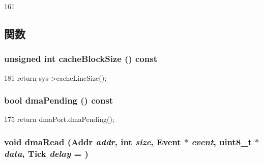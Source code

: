 \begin{DoxyCode}
161 { }
\end{DoxyCode}


\subsection{関数}
\hypertarget{classDmaDevice_a3e6e4aa434d2b5c83de3660307a49001}{
\subsubsection[{cacheBlockSize}]{\setlength{\rightskip}{0pt plus 5cm}unsigned int cacheBlockSize () const}}
\label{classDmaDevice_a3e6e4aa434d2b5c83de3660307a49001}



\begin{DoxyCode}
181 { return sys->cacheLineSize(); }
\end{DoxyCode}
\hypertarget{classDmaDevice_a481b9352c138101d0f84f163a760c6e5}{
\subsubsection[{dmaPending}]{\setlength{\rightskip}{0pt plus 5cm}bool dmaPending () const}}
\label{classDmaDevice_a481b9352c138101d0f84f163a760c6e5}



\begin{DoxyCode}
175 { return dmaPort.dmaPending(); }
\end{DoxyCode}
\hypertarget{classDmaDevice_a8ca93dacaa427cede08842a958aa1b23}{
\subsubsection[{dmaRead}]{\setlength{\rightskip}{0pt plus 5cm}void dmaRead ({\bf Addr} {\em addr}, \/  int {\em size}, \/  {\bf Event} $\ast$ {\em event}, \/  uint8\_\-t $\ast$ {\em data}, \/  {\bf Tick} {\em delay} = {})}}
\label{classDmaDevice_a8ca93dacaa427cede08842a958aa1b23}



